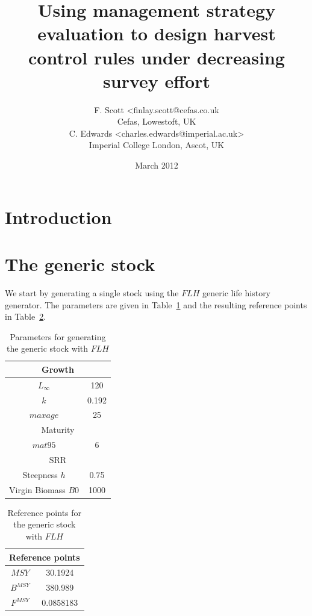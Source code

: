 \documentclass[a4paper]{article}
\begin{document}
\title{Using management strategy evaluation to design harvest control rules under decreasing survey effort}
\author{F. Scott <finlay.scott@cefas.co.uk\\
Cefas, Lowestoft, UK\\
C. Edwards <charles.edwards@imperial.ac.uk>\\
Imperial College London, Ascot, UK}
\date{March 2012}
\maketitle



\section{Introduction}

\section{The generic stock}

We start by generating a single stock using the $FLH$ generic life history generator. 
The parameters are given in Table~\ref{tab:genericStockParams} and the resulting reference points in Table~\ref{tab:genericRefPoints}.


\begin{table}
\centering
\begin{tabular}{|c|c|}
\hline
\multicolumn{2}{|c|}{Growth}\\
\hline
$L_{\infty}$ & 120     \\
$k$          & 0.192        \\
$maxage$     & 25\\
\hline
\multicolumn{2}{|c|}{Maturity}\\
\hline
$mat95$      & 6\\
\hline
\multicolumn{2}{|c|}{SRR}\\
\hline
Steepness $h$         & 0.75\\
Virgin Biomass $B0$         & 1000\\
\hline
\end{tabular}
\caption{Parameters for generating the generic stock with $FLH$}
\label{tab:genericStockParams}
\end{table}

\begin{table}
\centering
\begin{tabular}{|c|c|}
\hline
\multicolumn{2}{|c|}{Reference points}\\
\hline
$MSY$       & 30.1924\\
$B^{MSY}$   & 380.989\\
$F^{MSY}$   & 0.0858183\\
\hline
\end{tabular}
\caption{Reference points for the generic stock with $FLH$}
\label{tab:genericRefPoints}
\end{table}
\end{document}
